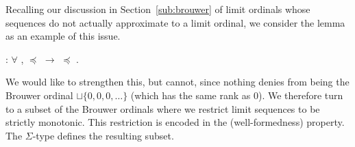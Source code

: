 Recalling our discussion in Section~\ref{sub:brouwer} of limit ordinals whose
sequences do not actually approximate to a limit ordinal, we consider the
lemma
as an example of this issue.
\begin{singlespace}
\begin{coqdoccode}
\coqdocnoindent
{}
:
\ensuremath{\forall} \coqdocvar{\ensuremath{\alpha}} \coqdocvar{\ensuremath{\beta}},
\coqdocvariable{\ensuremath{\alpha}} \ensuremath{\preceq}
\ensuremath{\rightarrow}
\coqdocvariable{\ensuremath{\alpha}} \ensuremath{\preceq}
\coqdocvariable{\ensuremath{\beta}}.\coqdoceol
\end{coqdoccode}
\end{singlespace}
We would like to strengthen this, but cannot, since nothing denies
\coqdocvariable{$\alpha$} from being the Brouwer ordinal $\sqcup \{ 0, 0, 0,
\ldots \}$ (which has the same rank as $0$). We therefore turn to a subset of
the Brouwer ordinals where we restrict limit sequences to be strictly
monotonic. This restriction is encoded in the
 (well-formedness)
property. The $\Sigma$-type
 defines
the resulting subset.
